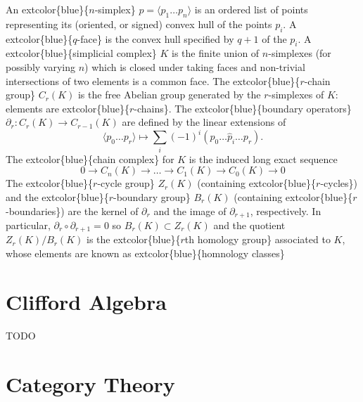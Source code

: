 \documentclass[
]{book}
\begin{document}
An extcolor\{blue\}\{\(n\)-simplex\} \(p = \langle p_1 \dots p_n \rangle\) is an ordered list of points representing its (oriented, or signed) convex hull of the points \(p_i\). A extcolor\{blue\}\{\(q\)-face\} is the convex hull specified by \(q + 1\) of the \(p_i\). A extcolor\{blue\}\{simplicial complex\} \(K\) is the finite union of \(n\)-simplexes (for possibly varying \(n\)) which is closed under taking faces and non-trivial intersections of two elements is a common face. The extcolor\{blue\}\{\(r\)-chain group\} \(C_r(K)\) is the free Abelian group generated by the \(r\)-simplexes of \(K\): elements are extcolor\{blue\}\{\(r\)-chains\}. The extcolor\{blue\}\{boundary operators\} \(\partial_{r} : C_{r}(K) \to C_{r-1}(K)\) are defined by the linear extensions of
\begin{equation}
    \langle p_0 \dots p_r \rangle \mapsto \sum_i (-1)^i (p_0 \dots \hat{p}_i \dots p_r).
\end{equation}
The extcolor\{blue\}\{chain complex\} for \(K\) is the induced long exact sequence
\begin{equation}
    0 \to C_n(K) \to \dots \to C_1(K) \to C_0(K) \to 0
\end{equation}
The extcolor\{blue\}\{\(r\)-cycle group\} \(Z_r(K)\) (containing extcolor\{blue\}\{\(r\)-cycles\}) and the extcolor\{blue\}\{\(r\)-boundary group\} \(B_r(K)\) (containing extcolor\{blue\}\{\(r\)-boundaries\}) are the kernel of \(\partial_r\) and the image of \(\partial_{r+1}\), respectively. In particular, \(\partial_{r} \circ \partial_{r+1} = 0\) so \(B_r(K) \subset Z_r(K)\) and the quotient \(Z_r(K)/B_r(K)\) is the extcolor\{blue\}\{\(r\)th homology group\} associated to \(K\), whose elements are known as extcolor\{blue\}\{homnology classes\}

\hypertarget{clifford-algebra}{%
\chapter{Clifford Algebra}\label{clifford-algebra}}

TODO

\hypertarget{category-theory}{%
\chapter{Category Theory}\label{category-theory}}
\end{document}
